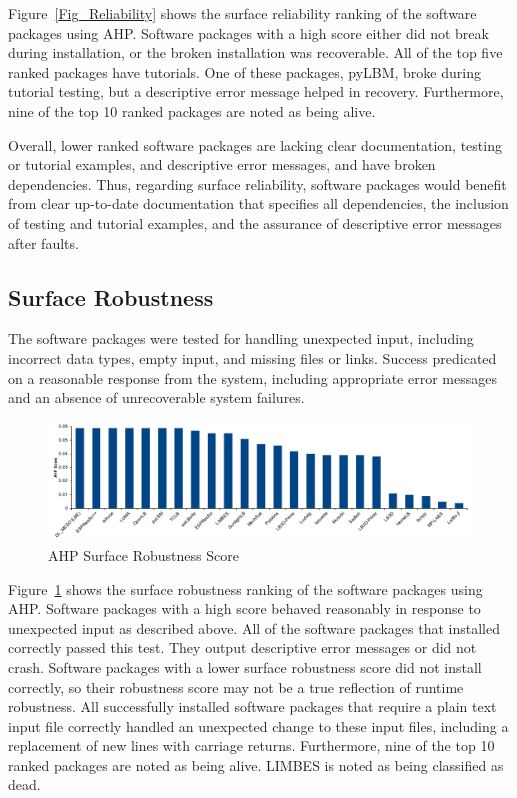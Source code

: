 \documentclass[final, 3p, times, authoryear]{elsarticle}
\begin{document}
Figure~\ref{Fig_Reliability} shows the surface reliability ranking of the
software packages using AHP. Software packages with a high score either did not
break during installation, or the broken installation was recoverable. All of
the top five ranked packages have tutorials. One of these packages, pyLBM, broke
during tutorial testing, but a descriptive error message helped in recovery.
Furthermore, nine of the top 10 ranked packages are noted as being alive. 

Overall, lower ranked software packages are lacking clear documentation, testing
or tutorial examples, and descriptive error messages, and have broken
dependencies. Thus, regarding surface reliability, software packages would
benefit from clear up-to-date documentation that specifies all dependencies, the
inclusion of testing and tutorial examples, and the assurance of descriptive
error messages after faults.

\subsection{Surface Robustness}

The software packages were tested for handling unexpected input, including
incorrect data types, empty input, and missing files or links. Success
predicated on a reasonable response from the system, including appropriate error
messages and an absence of unrecoverable system failures. 

\begin{figure}[h!]
	\begin{center}
		\includegraphics[width=1.0\textwidth]{./figures/robustness_chart.pdf}
		\caption{AHP Surface Robustness Score}
		\label{Fig_Robustness}
	\end{center}
\end{figure}

Figure~\ref{Fig_Robustness} shows the surface robustness ranking of the software
packages using AHP. Software packages with a high score behaved reasonably in
response to unexpected input as described above. All of the software packages
that installed correctly passed this test. They output descriptive error
messages or did not crash. Software packages with a lower surface robustness
score did not install correctly, so their robustness score may not be a true
reflection of runtime robustness. All successfully installed software packages
that require a plain text input file correctly handled an unexpected change to
these input files, including a replacement of new lines with carriage returns.
Furthermore, nine of the top 10 ranked packages are noted as being alive. LIMBES
is noted as being classified as dead.
\end{document}
